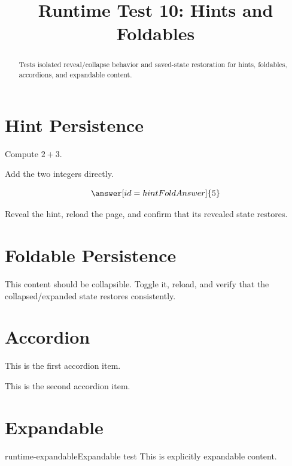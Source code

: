\documentclass{ximera}
\title{Runtime Test 10: Hints and Foldables}
\begin{document}
\begin{abstract}
Tests isolated reveal/collapse behavior and saved-state restoration for hints,
foldables, accordions, and expandable content.
\end{abstract}
\maketitle

\section{Hint Persistence}

\begin{problem}
Compute \(2+3\).
\begin{hint}
Add the two integers directly.
\end{hint}
\[
\answer[id=hintFoldAnswer]{5}
\]
\end{problem}

Reveal the hint, reload the page, and confirm that its revealed state restores.

\section{Foldable Persistence}

\begin{foldable}
This content should be collapsible. Toggle it, reload, and verify that the
collapsed/expanded state restores consistently.
\end{foldable}

\section{Accordion}

\begin{accordion}
\begin{accordion-item}
This is the first accordion item.
\end{accordion-item}
\begin{accordion-item}
This is the second accordion item.
\end{accordion-item}
\end{accordion}

\section{Expandable}

\begin{expandable}{runtime-expandable}{Expandable test}
This is explicitly expandable content.
\end{expandable}
\end{document}
